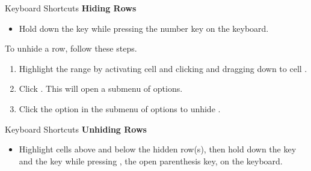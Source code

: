 \begin{center}
	\begin{shtcutbox}{Keyboard Shortcuts}
		\textbf{Hiding Rows}
		\\
		\begin{itemize}
			\setlength{\itemsep}{0pt}
			\setlength{\parskip}{0pt}
			\setlength{\parsep}{0pt}
			
			\item Hold down the  key while pressing the number  key on the keyboard.
			
		\end{itemize}
	\end{shtcutbox}
\end{center}

To unhide a row, follow these steps.

\begin{enumbox}
	\begin{enumerate}
		\item Highlight the range  by activating cell  and clicking and dragging down to cell .
		\item Click . This will open a submenu of options.
		\item Click the  option in the submenu of options to unhide .
	\end{enumerate}
\end{enumbox}
	
\begin{center}
	\begin{shtcutbox}{Keyboard Shortcuts}
		\textbf{Unhiding Rows}
		\\
		\begin{itemize}
			\setlength{\itemsep}{0pt}
			\setlength{\parskip}{0pt}
			\setlength{\parsep}{0pt}
			
			\item Highlight cells above and below the hidden row(s), then hold down the  key and the  key while pressing \fmtKeystroke{(}, the open parenthesis key, on the keyboard.
			
		\end{itemize}
	\end{shtcutbox}
\end{center}

